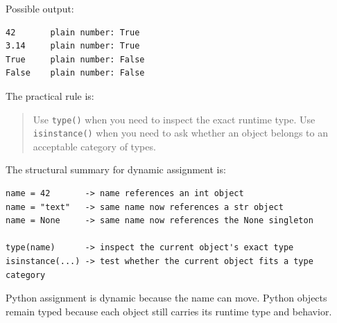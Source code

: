 Possible output:

\begin{verbatim}
42       plain number: True
3.14     plain number: True
True     plain number: False
False    plain number: False
\end{verbatim}

The practical rule is:

\begin{quote}
Use \texttt{type()} when you need to inspect the exact runtime type. Use \texttt{isinstance()} when you need to ask whether an object belongs to an acceptable category of types.
\end{quote}

The structural summary for dynamic assignment is:

\begin{verbatim}
name = 42       -> name references an int object
name = "text"   -> same name now references a str object
name = None     -> same name now references the None singleton

type(name)      -> inspect the current object's exact type
isinstance(...) -> test whether the current object fits a type category
\end{verbatim}

Python assignment is dynamic because the name can move. Python objects remain typed because each object still carries its runtime type and behavior.